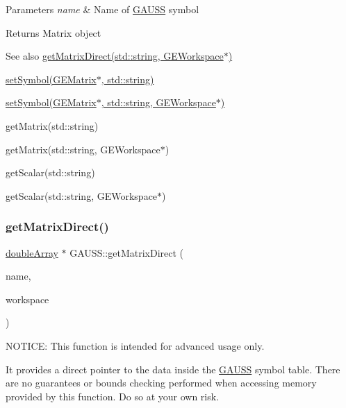 \begin{DoxyParams}{Parameters}
{\em name} & Name of \hyperlink{class_g_a_u_s_s}{G\+A\+U\+SS} symbol \\
\hline
\end{DoxyParams}
\begin{DoxyReturn}{Returns}
Matrix object
\end{DoxyReturn}
\begin{DoxySeeAlso}{See also}
\hyperlink{class_g_a_u_s_s_a9c413d1d5d7f4f271013ecca99f9e500}{get\+Matrix\+Direct(std\+::string, G\+E\+Workspace$\ast$)} 

\hyperlink{class_g_a_u_s_s_ab51cbcd5a66ba3355f52bf10bf31f7e3}{set\+Symbol(\+G\+E\+Matrix$\ast$, std\+::string)} 

\hyperlink{class_g_a_u_s_s_a23181c31041882ce839f816ce56e1231}{set\+Symbol(\+G\+E\+Matrix$\ast$, std\+::string, G\+E\+Workspace$\ast$)} 

get\+Matrix(std\+::string) 

get\+Matrix(std\+::string, G\+E\+Workspace$\ast$) 

get\+Scalar(std\+::string) 

get\+Scalar(std\+::string, G\+E\+Workspace$\ast$) 
\end{DoxySeeAlso}
\mbox{\label{class_g_a_u_s_s_a9c413d1d5d7f4f271013ecca99f9e500}} 
\subsubsection{\texorpdfstring{get\+Matrix\+Direct()}{getMatrixDirect()}\hspace{0.1cm}{\footnotesize\ttfamily [2/2]}}
{\footnotesize\ttfamily \hyperlink{classdouble_array}{double\+Array} $\ast$ G\+A\+U\+S\+S\+::get\+Matrix\+Direct (\begin{DoxyParamCaption}\item[{std\+::string}]{name,  }\item[{\hyperlink{class_g_e_workspace}{G\+E\+Workspace} $\ast$}]{workspace }\end{DoxyParamCaption})}



N\+O\+T\+I\+CE\+: This function is intended for advanced usage only. 

It provides a direct pointer to the data inside the \hyperlink{class_g_a_u_s_s}{G\+A\+U\+SS} symbol table. There are no guarantees or bounds checking performed when accessing memory provided by this function. Do so at your own risk.

